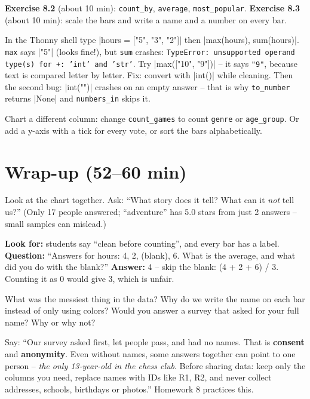 \textbf{Exercise 8.2} (about 10 min): \texttt{count\_by}, \texttt{average}, \texttt{most\_popular}. \textbf{Exercise 8.3} (about 10 min): scale the bars and write a name and a number on every bar.

\begin{bughunt}
In the Thonny shell type \py|hours = ["5", "3", "2"]| then \py|max(hours), sum(hours)|. \texttt{max} says \py|"5"| (looks fine!), but \texttt{sum} crashes: \texttt{TypeError: unsupported operand type(s) for +: 'int' and 'str'}. Try \py|max(["10", "9"])| -- it says \texttt{"9"}, because text is compared letter by letter. Fix: convert with \py|int()| while cleaning. Then the second bug: \py|int("")| crashes on an empty answer -- that is why \texttt{to\_number} returns \py|None| and \texttt{numbers\_in} skips it.
\end{bughunt}

\begin{freebuild}
Chart a different column: change \texttt{count\_games} to count \texttt{genre} or \texttt{age\_group}. Or add a y-axis with a tick for every vote, or sort the bars alphabetically.
\end{freebuild}

\section{Wrap-up (52--60 min)}
Look at the chart together. Ask: \enquote{What story does it tell? What can it \emph{not} tell us?} (Only 17 people answered; \enquote{adventure} has 5.0 stars from just 2 answers -- small samples can mislead.)

\begin{formativecheck}
\textbf{Look for:} students say \enquote{clean before counting}, and every bar has a label.
\textbf{Question:} \enquote{Answers for hours: 4, 2, (blank), 6. What is the average, and what did you do with the blank?}
\textbf{Answer:} 4 -- skip the blank: (4 + 2 + 6) / 3. Counting it as 0 would give 3, which is unfair.
\end{formativecheck}

\begin{reflection}
What was the messiest thing in the data? Why do we write the name on each bar instead of only using colors? Would you answer a survey that asked for your full name? Why or why not?
\end{reflection}

\begin{safety}
Say: \enquote{Our survey asked first, let people pass, and had no names. That is \textbf{consent} and \textbf{anonymity}. Even without names, some answers together can point to one person -- \emph{the only 13-year-old in the chess club}. Before sharing data: keep only the columns you need, replace names with IDs like R1, R2, and never collect addresses, schools, birthdays or photos.} Homework 8 practices this.
\end{safety}

